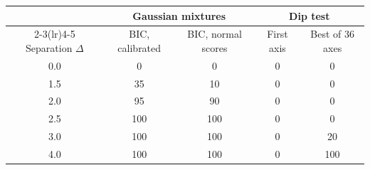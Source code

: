 \begin{tabular}{ccccc}\toprule
 & \multicolumn{2}{c}{Gaussian mixtures} & \multicolumn{2}{c}{Dip test} \\ \cmidrule(lr){2-3}\cmidrule(lr){4-5}
Separation $\Delta$ & BIC, calibrated & BIC, normal scores & First axis & Best of 36 axes \\ \midrule
0.0 & 0 & 0 & 0 & 0 \\
1.5 & 35 & 10 & 0 & 0 \\
2.0 & 95 & 90 & 0 & 0 \\
2.5 & 100 & 100 & 0 & 0 \\
3.0 & 100 & 100 & 0 & 20 \\
4.0 & 100 & 100 & 0 & 100 \\
\bottomrule\end{tabular}